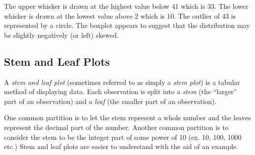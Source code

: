 \begin{example}
\noindent
The upper whisker is drawn at the highest value below 41 which is 33. The lower whisker is drawn at the lowest value above 2 which is 10. The outlier of 43 is represented by a circle. The boxplot appears to suggest that the distribution may be slightly negatively (or left) skewed.

\end{example}

\pagebreak


\subsection{Stem and Leaf Plots}

A \textit{stem and leaf plot} (sometimes referred to as simply a \textit{stem plot}) is a tabular method of displaying data.
Each observation is split into a \textit{stem} (the ``larger'' part of an observation) and a \textit{leaf} (the smaller part of an observation).\\

\vspace*{-0.50em}

One common partition is to let the stem represent a whole number and the leaves represent the decimal part of the number.
Another common partition is to consider the stem to be the integer part of some power of 10 (ex. 10, 100, 1000 etc.) Stem and leaf plots are easier to understand with the aid of an example.

